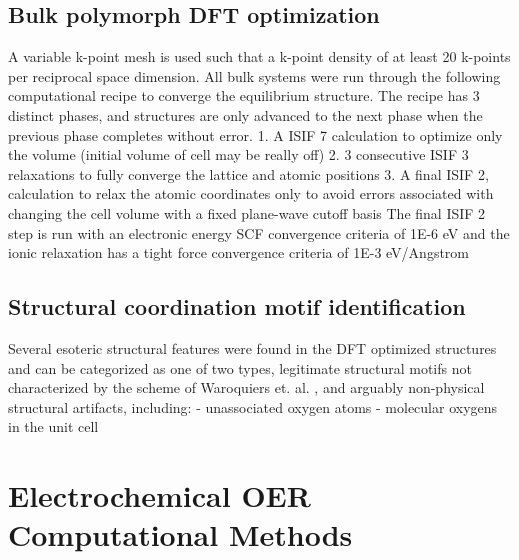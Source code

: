 \subsection{Bulk polymorph DFT optimization}

%
A variable k-point mesh is used such that a k-point density of at least 20 k-points per reciprocal space dimension.
%
All bulk systems were run through the following computational recipe to converge the equilibrium structure.
%
The recipe has 3 distinct phases, and structures are only advanced to the next phase when the previous phase completes without error.
%
1. A ISIF 7 calculation to optimize only the volume (initial volume of cell may be really off)
%
2. 3 consecutive ISIF 3 relaxations to fully converge the lattice and atomic positions
%
3. A final ISIF 2, calculation to relax the atomic coordinates only to avoid errors associated with changing the cell volume with a fixed plane-wave cutoff basis
%
The final ISIF 2 step is run with an electronic energy SCF convergence criteria of 1E-6 eV and the ionic relaxation has a tight force convergence criteria of 1E-3 eV/Angstrom

\subsection{Structural coordination motif identification}
Several esoteric structural features were found in the DFT optimized structures and can be categorized as one of two types, legitimate structural motifs not characterized by the scheme of Waroquiers et. al. \cite{Waroquiers2017}, and arguably non-physical structural artifacts, including:
- unassociated oxygen atoms
- molecular oxygens in the unit cell



\section{Electrochemical OER Computational Methods}  %
%

